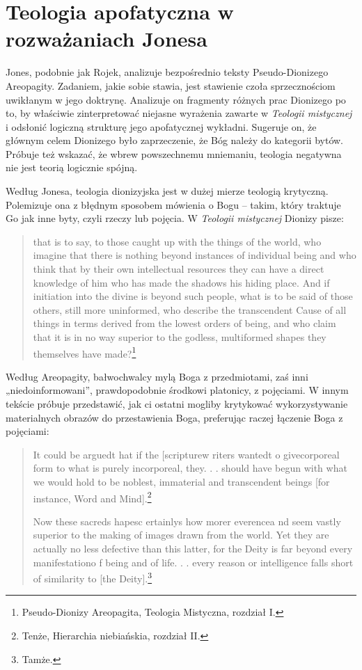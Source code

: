 \clearpage
\section{Teologia apofatyczna w rozważaniach Jonesa}

Jones, podobnie jak Rojek, analizuje bezpośrednio teksty
Pseudo-Dionizego Areopagity. Zadaniem, jakie sobie stawia, jest
stawienie czoła sprzecznościom uwikłanym w jego doktrynę. Analizuje on
fragmenty różnych prac Dionizego po to, by właściwie zinterpretować
niejasne wyrażenia zawarte w \textit{Teologii mistycznej} i odsłonić
logiczną strukturę jego apofatycznej wykładni. Sugeruje on, że głównym
celem Dionizego było zaprzeczenie, że Bóg należy do kategorii bytów.
Próbuje też wskazać, że wbrew powszechnemu mniemaniu, teologia
negatywna nie jest teorią logicznie spójną.

Według Jonesa, teologia dionizyjska jest w dużej mierze teologią
krytyczną. Polemizuje ona z błędnym sposobem mówienia o Bogu -- takim,
który traktuje Go jak inne byty, czyli rzeczy lub pojęcia. W
\textit{Teologii mistycznej} Dionizy pisze:

\begin{quote}
    that is to say, to those caught up with the things of the world, who
imagine that there is nothing beyond instances of individual being and
who think that by their own intellectual resources they can have a
direct knowledge of him who has made the shadows his hiding place. And
if initiation into the divine is beyond such people, what is to be said
of those others, still more uninformed, who describe the transcendent
Cause of all things in terms derived from the lowest orders of being,
and who claim that it is in no way superior to the godless, multiformed
shapes they themselves have made?\footnote{Pseudo-Dionizy Areopagita,
Teologia Mistyczna, rozdział I.}
\end{quote}


Według Areopagity, bałwochwalcy mylą Boga z przedmiotami, zaś inni
„niedoinformowani”, prawdopodobnie środkowi platonicy, z pojęciami. W
innym tekście próbuje przedstawić, jak ci ostatni mogliby krytykować
wykorzystywanie materialnych obrazów do przestawienia Boga, preferując
raczej łączenie Boga z pojęciami:


\begin{quote}
    It could be arguedt hat if the [scripturew riters wantedt o
givecorporeal form to what is purely incorporeal, they. . . should have
begun with what we would hold to be noblest, immaterial and
transcendent beings [for instance, Word and Mind].\footnote{Tenże,
Hierarchia niebiańskia, rozdział II.}

Now these sacreds hapesc ertainlys how morer everencea nd seem vastly
superior to the making of images drawn from the world. Yet they are
actually no less defective than this latter, for the Deity is far
beyond every manifestationo f being and of life. . . every reason or
intelligence falls short of similarity to [the Deity].\footnote{Tamże.}
\end{quote}

